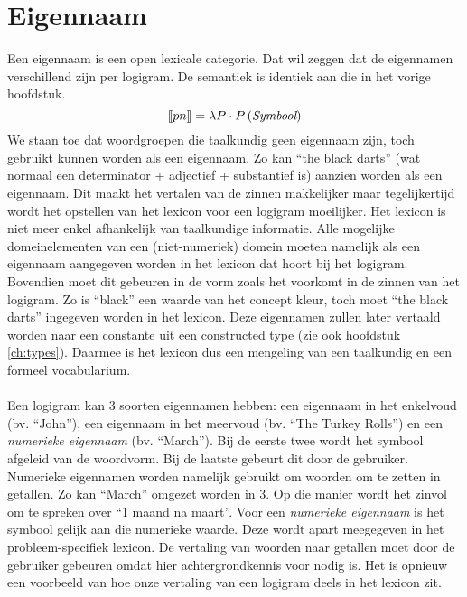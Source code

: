 \section{Eigennaam}
Een eigennaam is een open lexicale categorie. Dat wil zeggen dat de eigennamen verschillend zijn per logigram. De semantiek is identiek aan die in het vorige hoofdstuk. $$\llbracket pn\rrbracket = \lambda P \cdot P \left( \textit{Symbool} \right)$$ We staan toe dat woordgroepen die taalkundig geen eigennaam zijn, toch gebruikt kunnen worden als een eigennaam. Zo kan ``the black darts'' (wat normaal een determinator + adjectief + substantief is) aanzien worden als een eigennaam. Dit maakt het vertalen van de zinnen makkelijker maar tegelijkertijd wordt het opstellen van het lexicon voor een logigram moeilijker. Het lexicon is niet meer enkel afhankelijk van taalkundige informatie. Alle mogelijke domeinelementen van een (niet-numeriek) domein moeten namelijk als een eigennaam aangegeven worden in het lexicon dat hoort bij het logigram. Bovendien moet dit gebeuren in de vorm zoals het voorkomt in de zinnen van het logigram. Zo is ``black'' een waarde van het concept kleur, toch moet ``the black darts'' ingegeven worden in het lexicon. Deze eigennamen zullen later vertaald worden naar een constante uit een constructed type (zie ook hoofdstuk \ref{ch:types}). Daarmee is het lexicon dus een mengeling van een taalkundig en een formeel vocabularium.

\paragraph{}Een logigram kan 3 soorten eigennamen hebben: een eigennaam in het enkelvoud (bv. ``John''), een eigennaam in het meervoud (bv. ``The Turkey Rolls'') en een \textit{numerieke eigennaam} (bv. ``March''). Bij de eerste twee wordt het symbool afgeleid van de woordvorm. Bij de laatste gebeurt dit door de gebruiker. Numerieke eigennamen worden namelijk gebruikt om woorden om te zetten in getallen. Zo kan ``March'' omgezet worden in 3. Op die manier wordt het zinvol om te spreken over ``1 maand na maart''. Voor een \textit{numerieke eigennaam} is het symbool gelijk aan die numerieke waarde. Deze wordt apart meegegeven in het probleem-specifiek lexicon. De vertaling van woorden naar getallen moet door de gebruiker gebeuren omdat hier achtergrondkennis voor nodig is. Het is opnieuw een voorbeeld van hoe onze vertaling van een logigram deels in het lexicon zit.

